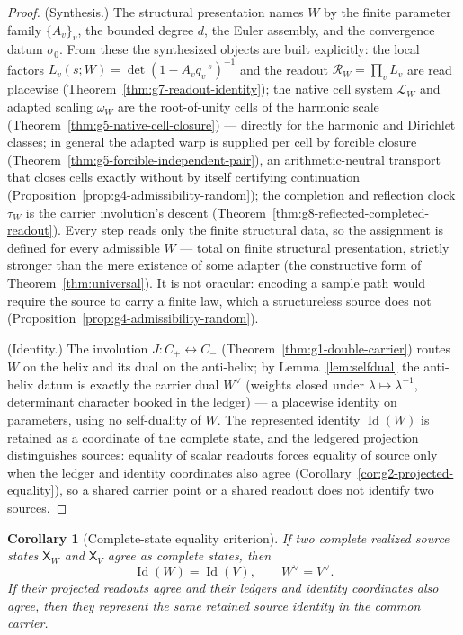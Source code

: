 \documentclass[11pt]{article}
\newtheorem{corollary}[theorem]{Corollary}
\theoremstyle{definition}
\begin{document}
\begin{proof}
(Synthesis.)  The structural presentation names \(W\) by the finite parameter family
\(\{A_v\}_v\), the bounded degree \(d\), the Euler assembly, and the
convergence datum \(\sigma_0\).  From these the synthesized objects are built
explicitly: the local factors \(L_v(s;W)=\det(1-A_vq_v^{-s})^{-1}\) and the
readout \(\mathcal R_W=\prod_vL_v\) are read placewise
(Theorem~\ref{thm:g7-readout-identity}); the native cell system
\(\mathcal L_W\) and adapted scaling \(\omega_W\) are the root-of-unity cells of
the harmonic scale (Theorem~\ref{thm:g5-native-cell-closure}) --- directly for
the harmonic and Dirichlet classes; in general the adapted warp is supplied per
cell by forcible closure (Theorem~\ref{thm:g5-forcible-independent-pair}), an
arithmetic-neutral transport that closes cells exactly without by itself
certifying continuation
(Proposition~\ref{prop:g4-admissibility-random}); the completion
and reflection clock \(\tau_W\) is the carrier involution's descent
(Theorem~\ref{thm:g8-reflected-completed-readout}).  Every step reads only the
finite structural data, so the assignment is defined for every admissible
\(W\) --- total on finite structural presentation, strictly stronger than the
mere existence of some adapter (the constructive form of
Theorem~\ref{thm:universal}).  It is not oracular: encoding a sample path would
require the source to carry a finite law, which a structureless source does not
(Proposition~\ref{prop:g4-admissibility-random}).

(Identity.)  The involution \(J:C_+\leftrightarrow C_-\)
(Theorem~\ref{thm:g1-double-carrier}) routes \(W\) on the helix and its dual on
the anti-helix; by Lemma~\ref{lem:selfdual} the anti-helix datum is exactly the
carrier dual \(W^\vee\) (weights closed under \(\lambda\mapsto\lambda^{-1}\),
determinant character booked in the ledger) --- a placewise identity on
parameters, using no self-duality of \(W\).  The represented identity
\(\operatorname{Id}(W)\) is retained as a coordinate of the complete state, and
the ledgered projection distinguishes sources: equality of scalar readouts
forces equality of source only when the ledger and identity coordinates also
agree (Corollary~\ref{cor:g2-projected-equality}), so a shared carrier point or
a shared readout does not identify two sources.
\end{proof}

\begin{corollary}[Complete-state equality criterion]\label{cor:g3-complete-state-identity}
If two complete realized source states \(\mathsf X_W\) and \(\mathsf X_V\)
agree as complete states, then
\[
\operatorname{Id}(W)=\operatorname{Id}(V),
\qquad
W^\vee=V^\vee.
\]
If their projected readouts agree and their ledgers and identity coordinates
also agree, then they represent the same retained source identity in the
common carrier.
\end{corollary}
\end{document}
